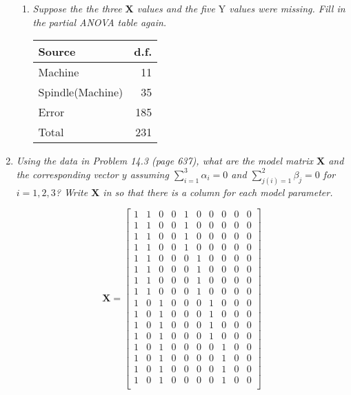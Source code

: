 \documentclass[11pt]{article}
\begin{document}
\begin{enumerate}
\begin{enumerate}
\item %
{\it Suppose the the three \(\mathbf{X}\) values and the five \(\mathrm{Y}\)
values were missing. Fill in the partial ANOVA table again.}

\begin{table}[H]\centering
\begin{tabular}{lr}
Source & d.f. \\
\hline
Machine & 11 \\
Spindle(Machine) & 35 \\
Error & 185 \\
\hline
Total & 231
\end{tabular}
\end{table}

\end{enumerate}

\pagebreak
\item %
{\it Using the data in Problem 14.3 (page 637), what are the model matrix
\(\mathbf{X}\) and the corresponding vector \(y\) assuming
\(\displaystyle\sum_{i=1}^3\alpha_i=0\) and
\(\displaystyle\sum_{j(i)=1}^2\beta_j=0\) for \(i=1,2,3\)? Write \(\mathbf{X}\)
in so that there is a column for each model parameter.}

\begin{equation*}
\mathbf{X}=\begin{bmatrix}
1 & 1 & 0 & 0 & 1 & 0 & 0 & 0 & 0 & 0 \\
1 & 1 & 0 & 0 & 1 & 0 & 0 & 0 & 0 & 0 \\
1 & 1 & 0 & 0 & 1 & 0 & 0 & 0 & 0 & 0 \\
1 & 1 & 0 & 0 & 1 & 0 & 0 & 0 & 0 & 0 \\

1 & 1 & 0 & 0 & 0 & 1 & 0 & 0 & 0 & 0 \\
1 & 1 & 0 & 0 & 0 & 1 & 0 & 0 & 0 & 0 \\
1 & 1 & 0 & 0 & 0 & 1 & 0 & 0 & 0 & 0 \\
1 & 1 & 0 & 0 & 0 & 1 & 0 & 0 & 0 & 0 \\

1 & 0 & 1 & 0 & 0 & 0 & 1 & 0 & 0 & 0 \\
1 & 0 & 1 & 0 & 0 & 0 & 1 & 0 & 0 & 0 \\
1 & 0 & 1 & 0 & 0 & 0 & 1 & 0 & 0 & 0 \\
1 & 0 & 1 & 0 & 0 & 0 & 1 & 0 & 0 & 0 \\

1 & 0 & 1 & 0 & 0 & 0 & 0 & 1 & 0 & 0 \\
1 & 0 & 1 & 0 & 0 & 0 & 0 & 1 & 0 & 0 \\
1 & 0 & 1 & 0 & 0 & 0 & 0 & 1 & 0 & 0 \\
1 & 0 & 1 & 0 & 0 & 0 & 0 & 1 & 0 & 0 \\


\end{bmatrix}
\end{equation*}
\end{enumerate}
\end{document}
